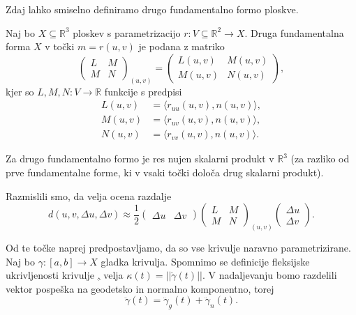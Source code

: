 Zdaj lahko smiselno definiramo drugo fundamentalno formo ploskve.

\begin{definicija}
\label{def_druga_fundamentalna_forma_ploskve}
 Naj bo $X \subseteq \mathbb{R}^3$ ploskev s parametrizacijo $r: V \subseteq \mathbb{R}^2 \to  X$. Druga fundamentalna forma $X$ v točki $m = r(u,v)$ je podana z matriko 
 \begin{equation*} \begin{pmatrix}
 L & M \\
 M & N
 \end{pmatrix}_{(u,v)} = \begin{pmatrix}
 L(u,v) & M(u,v) \\
 M(u,v) & N(u,v)
 \end{pmatrix}, \end{equation*}
 kjer so $L, M, N: V \to  \mathbb{R}$ funkcije s predpisi 
 \begin{align*}
    L(u,v)  &= \langle r_{uu}(u,v), n(u,v) \rangle,  \\
    M(u,v)  &= \langle r_{uv}(u,v), n(u,v) \rangle,  \\
    N(u,v)  &= \langle r_{vv}(u,v), n(u,v) \rangle. 
 \end{align*}

\end{definicija}

\begin{opomba}
    Za drugo fundamentalno formo je res nujen skalarni produkt v $\mathbb{R}^3$ (za razliko od prve fundamentalne forme, ki v vsaki točki določa drug skalarni produkt). 
\end{opomba}

Razmislili smo, da velja ocena razdalje
\begin{equation*} d(u, v, \Delta u, \Delta v) \approx \frac{1}{2} \begin{pmatrix}
  \Delta u  &  \Delta v 
\end{pmatrix} \begin{pmatrix}
  L & M \\
  M & N
\end{pmatrix}_{(u,v)}  
\begin{pmatrix}
  \Delta u \\
  \Delta v 
\end{pmatrix}.\end{equation*}

Od te točke naprej predpostavljamo, da so vse krivulje naravno parametrizirane. Naj bo $\gamma: [a,b] \to X$ gladka krivulja. 
Spomnimo se definicije fleksijske ukrivljenosti krivulje \href{def_fleksijska_ukrivljenost}, velja $\kappa(t) = \lvert\lvert \ddot{\gamma}(t) \rvert\rvert$.
V nadaljevanju bomo razdelili vektor pospeška na geodetsko in normalno komponentno, torej 
\begin{equation*} \ddot{\gamma}(t) = \ddot{\gamma}_g(t) + \ddot{\gamma}_n(t).\end{equation*}

